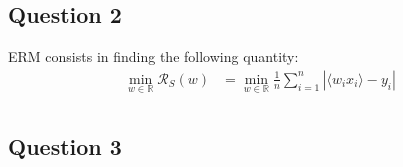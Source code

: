 \documentclass{article}
\newcommand{\1}{\mathbf{1}}
\newcommand{\R}{\mathbb{R}}
\begin{document}
\subsection{Question 2}
ERM consists in finding the following quantity:
\begin{align*}
  \min_{w \in \R} \mathcal{R}_S (w)
   & = \min_{w \in \R} \frac{1}{n} \sum_{i=1}^n |\langle w_i x_i \rangle - y_i|  \\
\end{align*}





\subsection{Question 3}
\end{document}
